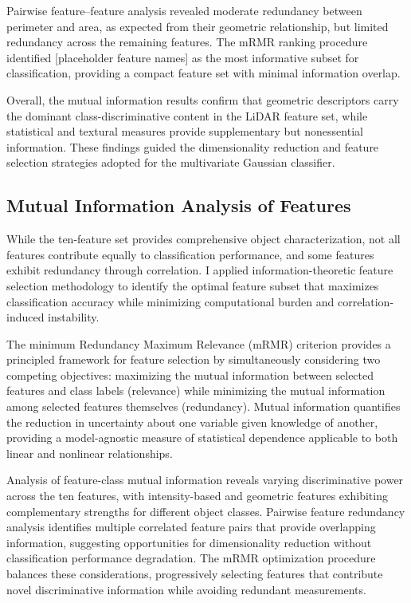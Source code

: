 \documentclass[../main.tex]{subfiles}
\begin{document}
Pairwise feature–feature analysis revealed moderate redundancy between perimeter and area, as expected from their geometric relationship, but limited redundancy across the remaining features. 
The mRMR ranking procedure identified [placeholder feature names] as the most informative subset for classification, providing a compact feature set with minimal information overlap.

Overall, the mutual information results confirm that geometric descriptors carry the dominant class-discriminative content in the LiDAR feature set, while statistical and textural measures provide supplementary but nonessential information. 
These findings guided the dimensionality reduction and feature selection strategies adopted for the multivariate Gaussian classifier.

\subsection{Mutual Information Analysis of Features} \label{sec:gbcache_MI_features}

While the ten-feature set provides comprehensive object characterization, not all features contribute equally to classification performance, and some features exhibit redundancy through correlation.
I applied information-theoretic feature selection methodology to identify the optimal feature subset that maximizes classification accuracy while minimizing computational burden and correlation-induced instability.

The minimum Redundancy Maximum Relevance (mRMR) criterion provides a principled framework for feature selection by simultaneously considering two competing objectives: maximizing the mutual information between selected features and class labels (relevance) while minimizing the mutual information among selected features themselves (redundancy).
Mutual information quantifies the reduction in uncertainty about one variable given knowledge of another, providing a model-agnostic measure of statistical dependence applicable to both linear and nonlinear relationships.

Analysis of feature-class mutual information reveals varying discriminative power across the ten features, with intensity-based and geometric features exhibiting complementary strengths for different object classes.
Pairwise feature redundancy analysis identifies multiple correlated feature pairs that provide overlapping information, suggesting opportunities for dimensionality reduction without classification performance degradation.
The mRMR optimization procedure balances these considerations, progressively selecting features that contribute novel discriminative information while avoiding redundant measurements.
\end{document}
